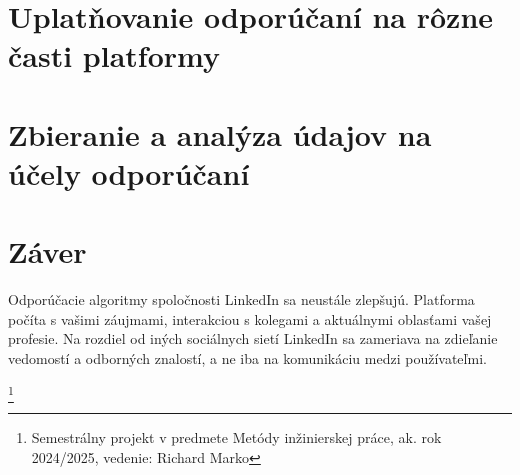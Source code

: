\documentclass[twoside,slovak,a4paper]{coursepaper}
\begin{document}


\section{Uplatňovanie odporúčaní na rôzne časti platformy} \label{Uplatňovanie}


\section{Zbieranie a analýza údajov na účely odporúčaní} \label{analýza údajov}
 

\section{Záver} \label{zaver}
Odporúčacie algoritmy spoločnosti LinkedIn sa neustále zlepšujú. Platforma počíta s vašimi záujmami, interakciou s kolegami a aktuálnymi oblasťami vašej profesie. Na rozdiel od iných sociálnych sietí LinkedIn sa zameriava na zdieľanie vedomostí a odborných znalostí, a ne iba na komunikáciu medzi používateľmi.

\thanks{Semestrálny projekt v predmete Metódy inžinierskej práce, ak. rok 2024/2025, vedenie: Richard Marko}


 
\end{document}
